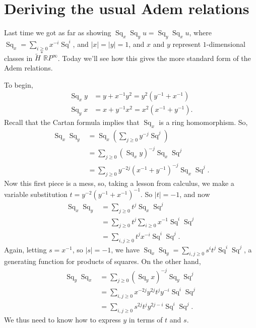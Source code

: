 \documentclass{article}
\providecommand{\OutputDerivingTheUsualAdemRelations}{8}
\newcommand{\R}{\mathbb{R}}
\newcommand{\RP}{\R P}
\DeclareMathOperator{\Sq}{Sq}
\begin{document}
\fi
\section{Deriving the usual Adem relations} %
\ifx\OutputDerivingTheUsualAdemRelations\undefined\else
Last time we got as far as showing $\Sq_x \Sq_y u = \Sq_y \Sq_x u$, where $\Sq_x = \sum_{i \ge 0} x^{-i} \Sq^i$, and $|x| = |y| = 1$, and $x$ and $y$ represent $1$-dimensional classes in $\widetilde H^* \RP^\infty$. %
Today we'll see how this gives the more standard form of the Adem relations.

To begin,
\begin{align*}
\Sq_x y & = y + x^{-1} y^2 = y^2(y^{-1} + x^{-1}) \\
\Sq_y x & = x + y^{-1} x^2 = x^2(x^{-1} + y^{-1}).
\end{align*}
Recall that the Cartan formula implies that $\Sq_x$ is a ring homomorphism.  So,
\begin{align*}
\Sq_x \Sq_y & = \Sq_x \left( \sum_{j \ge 0} y^{-j} \Sq^j \right) \\
& = \sum_{j \ge 0}(\Sq_x y)^{-j} \Sq_x \Sq^j \\
& = \sum_{j \ge 0} y^{-2j}(x^{-1} + y^{-1})^{-j} \Sq_x \Sq^j.
\end{align*}
Now this first piece is a mess, so, taking a lesson from calculus, we make a variable substitution $t = y^{-2}(y^{-1} + x^{-1})^{-1}$.  So $|t| = -1$, and now
\begin{align*}
\Sq_x \Sq_y & = \sum_{j \ge 0} t^j \Sq_x \Sq^j \\
& = \sum_{j \ge 0} t^j \sum_{i \ge 0} x^{-1} \Sq^i \Sq^j \\
& = \sum_{i, j \ge 0} t^j x^{-i} \Sq^i \Sq^j.
\end{align*}
Again, letting $s = x^{-1}$, so $|s| = -1$, we have $\Sq_x \Sq_y = \sum_{i, j \ge 0} s^i t^j \Sq^i \Sq^j$, a generating function for products of squares.  On the other hand,
\begin{align*}
\Sq_y \Sq_x & = \sum_{j \ge 0}(\Sq_y x)^{-j} \Sq_y \Sq^j \\
& = \sum_{i, j \ge 0} x^{-2j} y^{2j} t^j y^{-i} \Sq^i \Sq^j \\
& = \sum_{i, j \ge 0} s^{2j} t^j y^{2j-i} \Sq^i \Sq^j.
\end{align*}
We thus need to know how to express $y$ in terms of $t$ and $s$.
\end{document}
